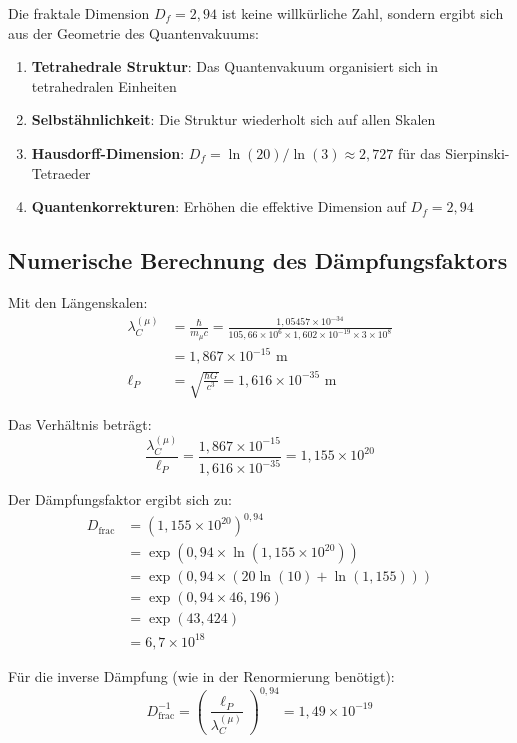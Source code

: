 \documentclass[12pt,a4paper]{article}
\theoremstyle{definition}
\begin{document}
	Die fraktale Dimension $D_f = 2{,}94$ ist keine willkürliche Zahl, sondern ergibt sich aus der Geometrie des Quantenvakuums:
	
	\begin{enumerate}
		\item \textbf{Tetrahedrale Struktur}: Das Quantenvakuum organisiert sich in tetrahedralen Einheiten
		\item \textbf{Selbstähnlichkeit}: Die Struktur wiederholt sich auf allen Skalen
		\item \textbf{Hausdorff-Dimension}: $D_f = \ln(20)/\ln(3) \approx 2{,}727$ für das Sierpinski-Tetraeder
		\item \textbf{Quantenkorrekturen}: Erhöhen die effektive Dimension auf $D_f = 2{,}94$
	\end{enumerate}
	
	\subsection{Numerische Berechnung des Dämpfungsfaktors}
	
	Mit den Längenskalen:
	\begin{align}
		\lambda_C^{(\mu)} &= \frac{\hbar}{m_\mu c} = \frac{1{,}05457 \times 10^{-34}}{105{,}66 \times 10^6 \times 1{,}602 \times 10^{-19} \times 3 \times 10^8}\\
		&= 1{,}867 \times 10^{-15} \text{ m}\\
		\ell_P &= \sqrt{\frac{\hbar G}{c^3}} = 1{,}616 \times 10^{-35} \text{ m}
	\end{align}
	
	Das Verhältnis beträgt:
	\begin{equation}
		\frac{\lambda_C^{(\mu)}}{\ell_P} = \frac{1{,}867 \times 10^{-15}}{1{,}616 \times 10^{-35}} = 1{,}155 \times 10^{20}
	\end{equation}
	
	Der Dämpfungsfaktor ergibt sich zu:
	\begin{align}
		D_{\text{frac}} &= \left(1{,}155 \times 10^{20}\right)^{0{,}94}\\
		&= \exp(0{,}94 \times \ln(1{,}155 \times 10^{20}))\\
		&= \exp(0{,}94 \times (20 \ln(10) + \ln(1{,}155)))\\
		&= \exp(0{,}94 \times 46{,}196)\\
		&= \exp(43{,}424)\\
		&= 6{,}7 \times 10^{18}
	\end{align}
	
	Für die inverse Dämpfung (wie in der Renormierung benötigt):
	\begin{equation}
		D_{\text{frac}}^{-1} = \left(\frac{\ell_P}{\lambda_C^{(\mu)}}\right)^{0{,}94} = 1{,}49 \times 10^{-19}
	\end{equation}
	
\end{document}
